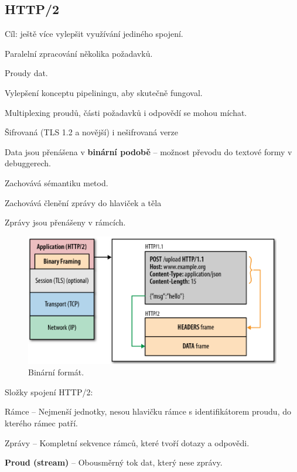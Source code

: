 \subsection{HTTP/2}

\begin{compactitem}
    \item Cíl: ještě více vylepšit využívání jediného spojení. \begin{compactitem}
        \item Paralelní zpracování několika požadavků.
        \item Proudy dat.
        \item Vylepšení konceptu pipeliningu, aby skutečně fungoval.
        \item Multiplexing proudů, části požadavků i odpovědí se mohou míchat.
    \end{compactitem}

    \item Šifrovaná (TLS 1.2 a novější) i nešifrovaná verze

    \item Data jsou přenášena v \textbf{binární podobě} -- možnost převodu do textové formy v debuggerech. \begin{compactitem}
        \item Zachovává sémantiku metod.
        \item Zachovává členění zprávy do hlaviček a těla
        \item Zprávy jsou přenášeny v rámcích.
    \end{compactitem}

    \begin{figure}[H]
        \centering
        \includegraphics[width=0.9\linewidth]{binary_format.png}
        \caption{Binární formát.}
    \end{figure}

    \item Složky spojení HTTP/2: \begin{compactitem}
        \item Rámce -- Nejmenší jednotky, nesou hlavičku rámce s identifikátorem proudu, do kterého rámec patří.
        \item Zprávy -- Kompletní sekvence rámců, které tvoří dotazy a odpovědi.
        \item \textbf{Proud (stream)} -- Obousměrný tok dat, který nese zprávy.
    \end{compactitem}


\end{compactitem}
